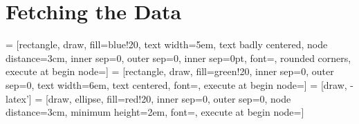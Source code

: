 \chapter{Fetching the Data}

 = [rectangle, 
  draw, 
  fill=blue!20, 
  text width=5em, 
  text badly centered, 
  node distance=3cm,
  inner sep=0,
  outer sep=0,
  inner sep=0pt, 
  font=\footnotesize,
rounded corners,
execute at begin node=\setlength{\baselineskip}{1em}]
 = [rectangle, 
  draw, 
  fill=green!20, 
  inner sep=0,
  outer sep=0,
  text width=6em, 
  text centered,
  font=\footnotesize,
  execute at begin node=\setlength{\baselineskip}{1em}] 
 = [draw, -latex']
 = [draw, 
  ellipse,
  fill=red!20,
  inner sep=0,
  outer sep=0,
  node distance=3cm,
  minimum height=2em,
  font=\footnotesize,
  execute at begin node=\setlength{\baselineskip}{1em}]
    
